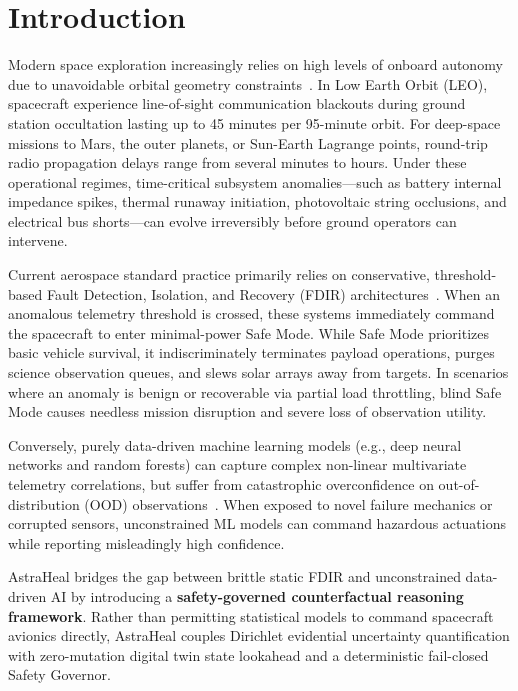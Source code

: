 \documentclass[10pt,twocolumn]{article}
\begin{document}
\section{Introduction}
Modern space exploration increasingly relies on high levels of onboard autonomy due to unavoidable orbital geometry constraints~\cite{chien2005autonomous}. In Low Earth Orbit (LEO), spacecraft experience line-of-sight communication blackouts during ground station occultation lasting up to 45 minutes per 95-minute orbit. For deep-space missions to Mars, the outer planets, or Sun-Earth Lagrange points, round-trip radio propagation delays range from several minutes to hours. Under these operational regimes, time-critical subsystem anomalies—such as battery internal impedance spikes, thermal runaway initiation, photovoltaic string occlusions, and electrical bus shorts—can evolve irreversibly before ground operators can intervene.

Current aerospace standard practice primarily relies on conservative, threshold-based Fault Detection, Isolation, and Recovery (FDIR) architectures~\cite{muscettola1998remote, williams2003model}. When an anomalous telemetry threshold is crossed, these systems immediately command the spacecraft to enter minimal-power Safe Mode. While Safe Mode prioritizes basic vehicle survival, it indiscriminately terminates payload operations, purges science observation queues, and slews solar arrays away from targets. In scenarios where an anomaly is benign or recoverable via partial load throttling, blind Safe Mode causes needless mission disruption and severe loss of observation utility.

Conversely, purely data-driven machine learning models (e.g., deep neural networks and random forests) can capture complex non-linear multivariate telemetry correlations, but suffer from catastrophic overconfidence on out-of-distribution (OOD) observations~\cite{guo2017calibration, lakshminarayanan2017simple}. When exposed to novel failure mechanics or corrupted sensors, unconstrained ML models can command hazardous actuations while reporting misleadingly high confidence.

AstraHeal bridges the gap between brittle static FDIR and unconstrained data-driven AI by introducing a \textbf{safety-governed counterfactual reasoning framework}. Rather than permitting statistical models to command spacecraft avionics directly, AstraHeal couples Dirichlet evidential uncertainty quantification with zero-mutation digital twin state lookahead and a deterministic fail-closed Safety Governor.
\end{document}

